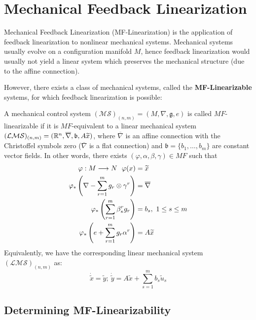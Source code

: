 \section{Mechanical Feedback Linearization}
Mechanical Feedback Linearization (MF-Linearization) is the application of feedback linearization to nonlinear mechanical systems. Mechanical systems usually evolve on a configuration manifold $M$, hence feedback linearization would usually not yield a linear system which preserves the mechanical structure (due to the affine connection). 

However, there exists a class of mechanical systems, called the \textbf{MF-Linearizable} systems, for which feedback linearization is possible:

\begin{defn}
    A mechanical control system $(\mathcal{MS})_{(n,m)} = (M, \nabla, \mathfrak{g}, e)$ is called $MF$-linearizable if it is $MF$-equivalent to a linear mechanical system $(\mathcal{LMS})_{(n,m)} = (\R[n], \overline{\nabla}, \mathfrak{b}, A \widetilde{x})$, where $\overline{\nabla}$ is an affine connection with the Christoffel symbols zero ($\overline{\nabla}$ is a flat connection) and $\mathfrak{b} = \{b_1, \dots, b_m \}$ are constant vector fields. In other words, there exists $(\varphi, \alpha, \beta, \gamma) \in MF$ such that 
    \begin{equation}
        \begin{split}
            \varphi: M \lra N \ \ \varphi(x)  &= \widetilde{x} \\
            \varphi_*\left(\nabla - \sum_{r=1}^m g_r \otimes \gamma^r\right) &= \overline{\nabla} \\
            \varphi_*\left( \sum_{r=1}^m \beta^r_s g_r \right) &= b_s, \ 1 \leq s \leq m \\
            \varphi_* \left( e + \sum_{r=1}^m g_r \alpha^r \right) &= A \widetilde{x}
        \end{split}
    \end{equation}
    Equivalently, we have the corresponding linear mechanical system $(\mathcal{LMS})_{(n,m)}$ as:
    \begin{equation}\label{sode-lin}
            \dot{\tilde{x}}  = \tilde{y}; \ 
            \dot{\tilde{y}}  = A \tilde{x} + \sum_{s=1}^m b_s \tilde{u}_s
    \end{equation}
\end{defn}


\subsection{Determining MF-Linearizability}

